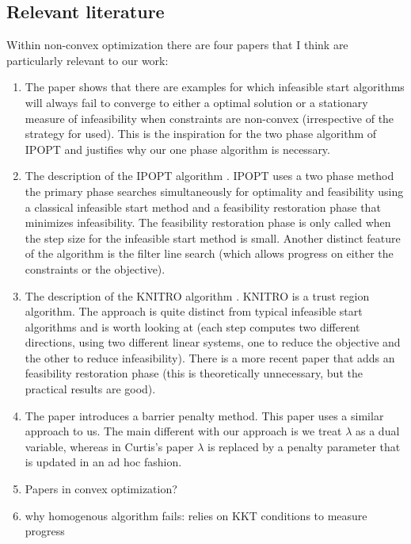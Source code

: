 \documentclass{article}
\begin{document}
\subsection{Relevant literature}

Within non-convex optimization there are four papers that I think are particularly relevant to our work:

\begin{enumerate}
\item The paper \cite{wachter2000failure} shows that there are examples for which infeasible start algorithms will always fail to converge to either a optimal solution or a stationary measure of infeasibility when constraints are non-convex (irrespective of the strategy for used). This is the inspiration for the two phase algorithm of IPOPT and justifies why our one phase algorithm is necessary.
\item The description of the IPOPT algorithm \cite{wachter2005line}. IPOPT uses a two phase method the primary phase searches simultaneously for optimality and feasibility using a classical infeasible start method and a feasibility restoration phase that minimizes infeasibility. The feasibility restoration phase is only called when the step size for the infeasible start method is small. Another distinct feature of the algorithm is the filter line search (which allows progress on either the constraints or the objective).
\item The description of the KNITRO algorithm \cite{byrd2006knitro}. KNITRO is a trust region algorithm. The approach is quite distinct from typical infeasible start algorithms and is worth looking at (each step computes two different directions, using two different linear systems, one to reduce the objective and the other to reduce infeasibility). There is a more recent paper \cite{nocedal2014interior} that adds an feasibility restoration phase (this is theoretically unnecessary, but the practical results are good). 
\item The paper \cite{curtis2012penalty} introduces a barrier penalty method. This paper uses a similar approach to us. The main different with our approach is we treat $\lambda$ as a dual variable, whereas in Curtis's paper $\lambda$ is replaced by a penalty parameter that is updated in an ad hoc fashion.
\item Papers in convex optimization?
\item why homogenous algorithm fails: relies on KKT conditions to measure progress
\end{enumerate}
\end{document}
